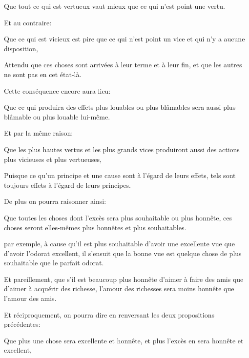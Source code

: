 \begin{emphpar}
	Que tout ce qui est vertueux vaut mieux que ce qui n'est point une vertu.
\end{emphpar}

Et au contraire:

\begin{emphpar}
	Que ce qui est vicieux est pire que ce qui n'est point un vice et qui n'y a aucune disposition,
\end{emphpar}

Attendu que ces choses sont arrivées à leur terme et à leur fin, et que les autres ne sont pas en cet état-là.

\bigbreak

Cette conséquence encore aura lieu:

\begin{emphpar}
	Que ce qui produira des effets plus louables ou plus blâmables sera aussi plus blâmable ou plus louable
	lui-même.
\end{emphpar}

Et par la même raison:

\begin{emphpar}
	Que les plus hautes vertus et les plus grands vices produiront aussi des actions plus vicieuses et plus
	vertueuses,
\end{emphpar}

Puisque ce qu'un principe et une cause sont à l’égard de leurs effets, tels sont toujours effets à l'égard de
leurs principes.

\bigbreak

De plus on pourra raisonner ainsi:

\begin{emphpar}
	Que toutes les choses dont l'excès sera plus souhaitable ou plus honnête, ces choses seront elles-mêmes
	plus honnêtes et plus souhaitables.
\end{emphpar}

par exemple, à cause qu'il est plus souhaitable d'avoir une excellente vue que d'avoir l'odorat excellent, il
s'ensuit que la bonne vue est quelque chose de plus souhaitable que le parfait odorat.

Et pareillement, que s'il est beaucoup plus honnête d'aimer à faire des amis que d'aimer à acquérir des richesse,
l'amour des richesses sera moins honnête que l'amour des amis.

Et réciproquement, on pourra dire en renversant les deux propositions précédentes:

\begin{emphpar}
	Que plus une chose sera excellente et honnête, et plus l'excès en sera honnête et excellent,
\end{emphpar}

